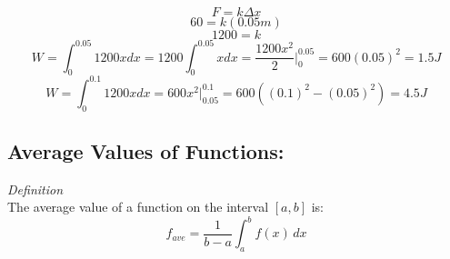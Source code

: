 \documentclass[12pt, letterpaper]{article}
\begin{document}
        \begin{center}
        \end{center}
        
        \begin{equation*}
            F = k \Delta x
        \end{equation*}
        \begin{equation*}
            60 = k(0.05m)
        \end{equation*}
        \begin{equation*}
            1200 = k
        \end{equation*}
        \begin{equation*}
            W = \int^{0.05}_0 1200x dx = 1200 \int^{0.05}_0 x dx = \frac{1200x^2}{2} \bigg|^{0.05}_0 = 600(0.05)^2 = 1.5J
        \end{equation*}
        \begin{equation*}
            W = \int^{0.1}_{0} 1200x dx = 600x^2 \bigg|^{0.1}_{0.05} = 600((0.1)^2 - (0.05)^2) = 4.5J
        \end{equation*}
        
    \subsection*{Average Values of Functions:}
        \textit{Definition}\\
        The average value of a function on the interval $[a, b]$ is:
            \begin{equation*}
                f_{ave} = \frac{1}{b - a} \int^b_a f(x) \,dx
            \end{equation*}
\end{document}
